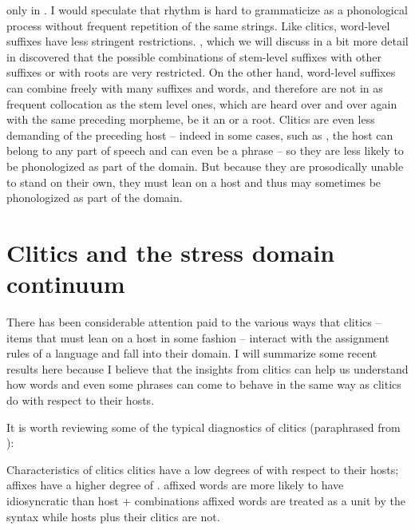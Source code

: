 \documentclass[output=paper,
modfonts
]{LSP/langsci}
\begin{document}
only in . I would speculate that rhythm is hard to grammaticize as a phonological process without frequent repetition of the same strings. Like clitics, word-level suffixes have less stringent  restrictions. \citet{fabb1988}, which we will discuss in a bit more detail in  discovered that the possible combinations of  stem-level suffixes with other suffixes or with roots are very restricted. On the other hand, word-level suffixes can combine freely with many suffixes and words, and therefore are not in as frequent collocation as the stem level ones, which are heard over and over again with the same preceding morpheme, be it an  or a root. Clitics are even less demanding of the preceding host -- indeed in some cases, such as , the host can belong to any part of speech and can even be a phrase -- so they are less likely to be phonologized as part of the  domain. But because they are prosodically unable to stand on their own, they must lean on a host and thus may sometimes be phonologized as part of the  domain. 

\section[Clitics and the stress domain continuum]{Clitics and the stress domain continuum}\label{sec:kaisse:2}

There has been considerable attention paid to the various ways that clitics --  items that must lean on a host in some fashion -- interact with the  assignment rules of a language and fall into their domain. I will summarize some recent results here because I believe that the insights from clitics can help us understand how  words and even some phrases can come to behave in the same way as clitics do with respect to their hosts.

It is worth reviewing some of the typical diagnostics of clitics (paraphrased from \citealt{zwickypullum1983}):

\ea \label{ex:kaisse:3} Characteristics of clitics
	\ea \label{ex:kaisse:3a} clitics have a low degrees of  with respect to their hosts; affixes have a higher degree of . 
	\ex \label{ex:kaisse:3b} affixed words are more likely to have idiosyncratic  than host +  combinations
	\ex \label{ex:kaisse:3c} affixed words are treated as a unit by the syntax while hosts plus their clitics are not. 
	\z
\z
\end{document}
